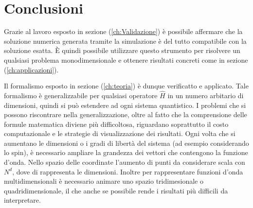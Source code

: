 \chapter*{Conclusioni}
\label{ch:conclusioni}

Grazie al lavoro esposto in sezione (\ref{ch:Validazione}) è possibile affermare che la soluzione numerica
generata tramite la simulazione è  del tutto compatibile con la soluzione esatta. 
È quindi possibile utilizzare questo strumento per risolvere un qualsiasi problema monodimensionale e ottenere risultati concreti come in sezione (\ref{ch:applicazioni}). 

Il formalismo esposto in sezione (\ref{ch:teoria}) è dunque verificatto e applicato. Tale formalismo è generalizzabile per qualsiasi operatore $\hat{H}$ in un numero arbitario di dimensioni, quindi si può estendere ad ogni sistema quantistico. I problemi che si possono riscontrare nella generalizzazione, oltre al fatto che la comprensione delle formule matematica diviene più difficoltosa, riguardano soprattutto il costo computazionale e le strategie di visualizzazione dei risultati. Ogni volta che si aumentano le dimensioni o i gradi di libertà del sistema (ad esempio considerando lo spin), è necessario ampliare la grandezza dei vettori che contengono la funzione d'onda. Nello spazio delle coordinate l'aumento di punti da considerare scala con $N^d$, dove di rappresenta le dimensioni. Inoltre per rappresentare funzioni d'onda multidimensionali è necessario animare uno spazio tridimesionale o quadridimensionale, il che anche se possibile rende i risultati più difficili da interpretare. 


